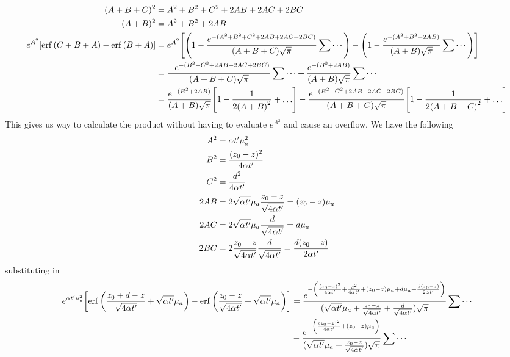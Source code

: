 \documentclass[]{article}
\begin{document}
\begin{align*}
	(A+B+C)^2 &= A^2 + B^2 + C^2 + 2AB + 2AC + 2BC \\
	(A+B)^2 &= A^2 + B^2 + 2AB \\
	e^{A^2} \qty[\erf\qty(C + B + A ) - \erf\qty(B + A)] &=
	e^{A^2} \qty[
	\qty(1 - \frac{e^{-(A^2+B^2+C^2+2AB+2AC+2BC)}}{(A+B+C)\sqrt{\pi}}\sum\cdots)
	 - 
	 \qty(1 - \frac{e^{-(A^2+B^2+2AB)}}{(A+B)\sqrt{\pi}}\sum\cdots)
	 	] \\
	 	&= 	 
	 	 \frac{-e^{-(B^2+C^2+2AB+2AC+2BC)}}{(A+B+C)\sqrt{\pi}}\sum\cdots
	 	+ 
		 \frac{e^{-(B^2+2AB)}}{(A+B)\sqrt{\pi}}\sum\cdots
	 	 \\
	 	 	 	&= 	 
	 	  \frac{e^{-(B^2+2AB)}}{(A+B)\sqrt{\pi}}\qty[1 - \frac{1}{2\qty(A+B)^2}+\ldots]
	 	 -
	 	 \frac{e^{-(B^2+C^2+2AB+2AC+2BC)}}{(A+B+C)\sqrt{\pi}}\qty[1 - \frac{1}{2\qty(A+B+C)^2}+\ldots]
	 	 	 	 \\
\end{align*}
This gives us way to calculate the product without having to evaluate $e^{A^2}$ and cause an overflow. We have the following
\begin{align*}
	A^2 &= \alpha t' \mu_a^2 \\
	B^2 &= \frac{(z_0 - z)^2}{4\alpha t'} \\
	C^2 &= \frac{d^2}{4\alpha t'} \\
	2AB&= 2\sqrt{\alpha t'} \mu_a  \frac{z_0 - z}{\sqrt{4\alpha t'}} = \qty(z_0 - z)\mu_a\\
	2AC&= 2\sqrt{\alpha t'} \mu_a  \frac{d}{\sqrt{4\alpha t'}} = d\mu_a\\
	2BC&= 2\frac{z_0 - z}{\sqrt{4\alpha t'}}  \frac{d}{\sqrt{4\alpha t'}} = \frac{d\qty(z_0 - z)}{2\alpha t'}\\
\end{align*}
substituting in
\begin{align*}
		e^{\alpha t' \mu_a^2} \qty[	
	\erf\qty(\frac{z_0 + d - z}{\sqrt{4\alpha t'}} + \sqrt{\alpha t'}\mu_a ) - \erf\qty(\frac{z_0 - z}{\sqrt{4\alpha t'}} + \sqrt{\alpha t'}\mu_a )]	&= 	 
	\frac{e^{-\qty(\frac{(z_0 - z)^2}{4\alpha t'}+\frac{d^2}{4\alpha t'}+\qty(z_0 - z)\mu_a+d\mu_a+\frac{d\qty(z_0 - z)}{2\alpha t'})}}{(  \sqrt{\alpha t'} \mu_a+\frac{z_0 - z}{\sqrt{4\alpha t'}}+\frac{d}{\sqrt{4\alpha t'}})\sqrt{\pi}}\sum\cdots\\
	&- 
	\frac{e^{-\qty(\frac{(z_0 - z)^2}{4\alpha t'}+\qty(z_0 - z)\mu_a)}}{(\sqrt{\alpha t'} \mu_a+\frac{z_0 - z}{\sqrt{4\alpha t'}})\sqrt{\pi}}\sum\cdots
	\\
\end{align*}
\end{document}
